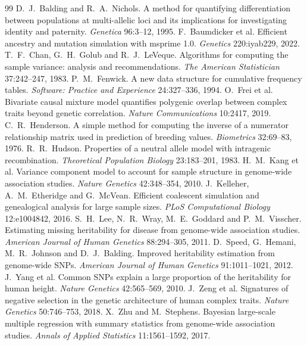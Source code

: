 \documentclass[11pt,a4paper]{article}
\begin{document}
\begin{thebibliography}{99}\small
{} D.~J.~Balding and R.~A.~Nichols. A method for quantifying differentiation between populations at multi-allelic loci and its implications for investigating identity and paternity. \emph{Genetica} 96:3--12, 1995.
 F.~Baumdicker et al. Efficient ancestry and mutation simulation with msprime 1.0. \emph{Genetics} 220:iyab229, 2022.
 T.~F.~Chan, G.~H.~Golub and R.~J.~LeVeque. Algorithms for computing the sample variance: analysis and recommendations. \emph{The American Statistician} 37:242--247, 1983.
 P.~M.~Fenwick. A new data structure for cumulative frequency tables. \emph{Software: Practice and Experience} 24:327--336, 1994.
 O.~Frei et al. Bivariate causal mixture model quantifies polygenic overlap between complex traits beyond genetic correlation. \emph{Nature Communications} 10:2417, 2019.
 C.~R.~Henderson. A simple method for computing the inverse of a numerator relationship matrix used in prediction of breeding values. \emph{Biometrics} 32:69--83, 1976.
 R.~R.~Hudson. Properties of a neutral allele model with intragenic recombination. \emph{Theoretical Population Biology} 23:183--201, 1983.
 H.~M.~Kang et al. Variance component model to account for sample structure in genome-wide association studies. \emph{Nature Genetics} 42:348--354, 2010.
 J.~Kelleher, A.~M.~Etheridge and G.~McVean. Efficient coalescent simulation and genealogical analysis for large sample sizes. \emph{PLoS Computational Biology} 12:e1004842, 2016.
 S.~H.~Lee, N.~R.~Wray, M.~E.~Goddard and P.~M.~Visscher. Estimating missing heritability for disease from genome-wide association studies. \emph{American Journal of Human Genetics} 88:294--305, 2011.
 D.~Speed, G.~Hemani, M.~R.~Johnson and D.~J.~Balding. Improved heritability estimation from genome-wide SNPs. \emph{American Journal of Human Genetics} 91:1011--1021, 2012.
 J.~Yang et al. Common SNPs explain a large proportion of the heritability for human height. \emph{Nature Genetics} 42:565--569, 2010.
 J.~Zeng et al. Signatures of negative selection in the genetic architecture of human complex traits. \emph{Nature Genetics} 50:746--753, 2018.
 X.~Zhu and M.~Stephens. Bayesian large-scale multiple regression with summary statistics from genome-wide association studies. \emph{Annals of Applied Statistics} 11:1561--1592, 2017.
\end{thebibliography}
\end{document}
